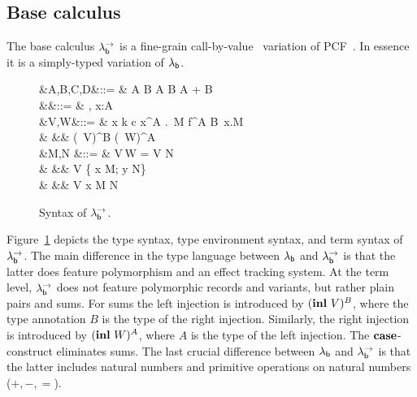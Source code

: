 \documentclass[12pt,phd,lfcs,twoside,openright,logo,leftchapter,normalheadings]{infthesis}
\theoremstyle{plain}
\theoremstyle{definition}
\begin{document}
\subsection{Base calculus}
\label{sec:base-calculus}
The base calculus $\lambda^\rightarrow_{\mathsf{b}}$ is a fine-grain
call-by-value~\cite{LevyPT03} variation of PCF~\cite{Plotkin77}.
%
In essence it is a simply-typed variation of $\lambda_{\mathsf{b}}$.
%
\begin{figure}
  \begin{syntax}
              &A,B,C,D\in\TypeCat  &::= & \Nat \mid \One \mid A \to B \mid A \times B \mid A + B \\
     &\Gamma\in\TyEnvCat &::= & \cdot \mid \Gamma, x:A \\
        &V,W\in\ValCat  &::= & x \mid k \mid c \mid \lambda x^A .\, M \mid \Rec \; f^{A \to B}\, x.M \\
                     &               &\mid& \Unit \mid {} \mid (\Inl\, V)^B \mid (\Inr\, W)^A\\
  &M,N\in\CompCat
                           &::= & V\,W
                            \mid  \Let\;  = V \; \In \; N \\
                     &     &\mid&\Case \; V \;\{ \Inl \; x \mapsto M; \Inr \; y \mapsto N\}\\
                     &    &\mid& \Return\; V
                           \mid \Let \; x \revto M \; \In \; N \\
\end{syntax}
\caption{Syntax of $\lambda^\rightarrow_{\mathsf{b}}$.}\label{fig:bpcf}
\end{figure}
%
Figure~\ref{fig:bpcf} depicts the type syntax, type environment
syntax, and term syntax of $\lambda^\rightarrow_{\mathsf{b}}$.
%
The main difference in the type language between $\lambda_{\mathsf{b}}$ and $\lambda^\rightarrow_{\mathsf{b}}$
is that the latter does feature polymorphism and an effect tracking
system. At the term level, $\lambda^\rightarrow_{\mathsf{b}}$ does not feature polymorphic
records and variants, but rather plain pairs and sums. For sums the
left injection is introduced by $(\mathbf{inl}~V)^B$, where the type
annotation $B$ is the type of the right injection. Similarly, the
right injection is introduced by $(\mathbf{inl}~W)^A$, where $A$ is the type
of the left injection. The $\mathbf{case}$-construct eliminates sums. The last
crucial difference between $\lambda_{\mathsf{b}}$ and $\lambda^\rightarrow_{\mathsf{b}}$ is that the latter
includes natural numbers and primitive operations on natural numbers
($+, -, =$).
%
\end{document}
